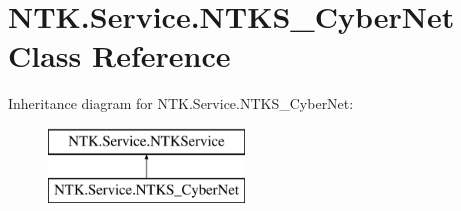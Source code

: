 \hypertarget{class_n_t_k_1_1_service_1_1_n_t_k_s___cyber_net}{}\section{N\+T\+K.\+Service.\+N\+T\+K\+S\+\_\+\+Cyber\+Net Class Reference}
\label{class_n_t_k_1_1_service_1_1_n_t_k_s___cyber_net}
Inheritance diagram for N\+T\+K.\+Service.\+N\+T\+K\+S\+\_\+\+Cyber\+Net\+:\begin{figure}[H]
\begin{center}
\leavevmode
\includegraphics[height=2.000000cm]{d5/d77/class_n_t_k_1_1_service_1_1_n_t_k_s___cyber_net}
\end{center}
\end{figure}

